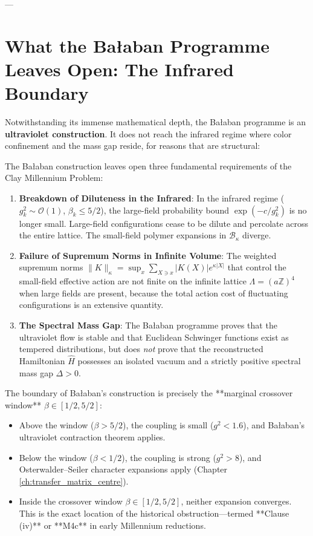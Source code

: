 ---

\section{What the Ba\l aban Programme Leaves Open: The Infrared Boundary}
\label{sec:what_balaban_leaves_open}

Notwithstanding its immense mathematical depth, the Ba\l aban programme is an \textbf{ultraviolet construction}. It does not reach the infrared regime where color confinement and the mass gap reside, for reasons that are structural:

\begin{proposition}
\label{prop:balaban_boundary}
The Ba\l aban construction leaves open three fundamental requirements of the Clay Millennium Problem:
\begin{enumerate}
    \item \textbf{Breakdown of Diluteness in the Infrared}: In the infrared regime ($g_k^2 \sim \mathcal{O}(1)$, $\beta_k \le 5/2$), the large-field probability bound $\exp(-c / g_k^2)$ is no longer small. Large-field configurations cease to be dilute and percolate across the entire lattice. The small-field polymer expansions in $\mathcal{B}_\kappa$ diverge.
    \item \textbf{Failure of Supremum Norms in Infinite Volume}: The weighted supremum norms $\|K\|_\kappa = \sup_x \sum_{X \ni x} |K(X)| e^{\kappa |X|}$ that control the small-field effective action are not finite on the infinite lattice $\Lambda = (a \mathbb{Z})^4$ when large fields are present, because the total action cost of fluctuating configurations is an extensive quantity.
    \item \textbf{The Spectral Mass Gap}: The Ba\l aban programme proves that the ultraviolet flow is stable and that Euclidean Schwinger functions exist as tempered distributions, but does \emph{not} prove that the reconstructed Hamiltonian $\hat{H}$ possesses an isolated vacuum and a strictly positive spectral mass gap $\Delta > 0$.
\end{enumerate}
\end{proposition}

The boundary of Ba\l aban's construction is precisely the **marginal crossover window** $\beta \in [1/2, 5/2]$:
\begin{itemize}
    \item Above the window ($\beta > 5/2$), the coupling is small ($g^2 < 1.6$), and Ba\l aban's ultraviolet contraction theorem applies.
    \item Below the window ($\beta < 1/2$), the coupling is strong ($g^2 > 8$), and Osterwalder--Seiler character expansions apply (Chapter \ref{ch:transfer_matrix_centre}).
    \item Inside the crossover window $\beta \in [1/2, 5/2]$, neither expansion converges. This is the exact location of the historical obstruction—termed **Clause (iv)** or **M4c** in early Millennium reductions.
\end{itemize}

